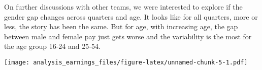 \documentclass[
]{article}
\newenvironment{Shaded}{\begin{snugshade}}{\end{snugshade}}
\newcommand{\DataTypeTok}[1]{\textcolor[rgb]{0.13,0.29,0.53}{#1}}
\newcommand{\DecValTok}[1]{\textcolor[rgb]{0.00,0.00,0.81}{#1}}
\newcommand{\FloatTok}[1]{\textcolor[rgb]{0.00,0.00,0.81}{#1}}
\newcommand{\KeywordTok}[1]{\textcolor[rgb]{0.13,0.29,0.53}{\textbf{#1}}}
\newcommand{\NormalTok}[1]{#1}
\newcommand{\OperatorTok}[1]{\textcolor[rgb]{0.81,0.36,0.00}{\textbf{#1}}}
\newcommand{\OtherTok}[1]{\textcolor[rgb]{0.56,0.35,0.01}{#1}}
\newcommand{\StringTok}[1]{\textcolor[rgb]{0.31,0.60,0.02}{#1}}
\begin{document}
On further discussions with other teams, we were interested to explore
if the gender gap changes across quarters and age. It looks like for all
quarters, more or less, the story has been the same. But for age, with
increasing age, the gap between male and female pay just gets worse and
the variability is the most for the age group 16-24 and 25-54.

\begin{Shaded}
\end{Shaded}

\texttt{[image: analysis\_earnings\_files/figure-latex/unnamed-chunk-5-1.pdf]}
\end{document}
